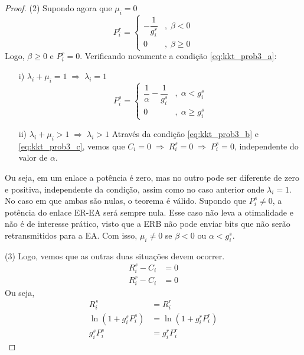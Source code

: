 \begin{proof}
    (2) Supondo agora que $\mu_i = 0$
    \begin{equation}
    P_i^r=
    \begin{cases}
    - \dfrac{1}{g_i^r} &,\; \beta < 0\\
    0 &,\; \beta \geq 0
    \end{cases}
    \end{equation}
    Logo, $\beta \geq 0$ e $P_i^r = 0$. Verificando novamente a condição \eqref{eq:kkt_prob3_a}:
    \begin{itemize}
    \item[i)] $\lambda_i + \mu_i = 1 \;\Rightarrow\; \lambda_i = 1$
    \begin{equation}
    P_i^s=
    \begin{cases}         
    \dfrac{1}{\alpha} - \dfrac{1}{g_i^s} &,\; \alpha < g_i^s\\
    0 &,\; \alpha \geq g_i^s
    \end{cases}
    \end{equation}
    \item[ii)] $ \lambda_i + \mu_i > 1 \;\Rightarrow\; \lambda_i > 1$
    Através da condição \eqref{eq:kkt_prob3_b} e \eqref{eq:kkt_prob3_c}, vemos que $C_i = 0\;\Rightarrow\;R_i^s=0\;\Rightarrow\;P_i^s=0$, independente do valor de $\alpha$.
    \end{itemize}
    
    Ou seja, em um enlace a potência é zero, mas no outro pode ser diferente de zero e positiva, independente da condição, assim como no caso anterior onde $\lambda_i = 1$. No caso em que ambas são nulas, o teorema é válido. Supondo que $P_i^s\neq 0$, a potência do enlace \ac{ER}-\ac{EA} será sempre nula. Esse caso não leva a otimalidade e não é de interesse prático, visto que a \ac{ERB} não pode enviar bits que não serão retransmitidos para a \ac{EA}. Com isso, $\mu_i \neq 0$ se $\beta < 0$ ou $\alpha < g_i^s$.

    (3) Logo, vemos que as outras duas situações devem ocorrer.
    \begin{align}
    R_i^s - C_i &= 0\\
    R_i^r - C_i &= 0
    \end{align}
    Ou seja,
    \begin{align}
    R_i^s &= R_i^r\\
    \ln\left(1 + g_i^sP_i^s\right) &= \ln\left(1 + g_i^rP_i^r\right)\\
    g_i^sP_i^s &= g_i^rP_i^r
    \end{align}
\end{proof}